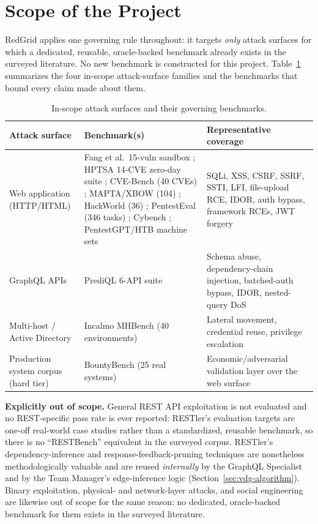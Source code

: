 \section{Scope of the Project}
\label{sec:intro_scope}

RedGrid applies one governing rule throughout: it targets \emph{only} attack surfaces for which a dedicated, reusable, oracle-backed benchmark already exists in the surveyed literature. No new benchmark is constructed for this project. Table~\ref{tab:in-scope-surfaces} summarizes the four in-scope attack-surface families and the benchmarks that bound every claim made about them.

\begin{table}[htbp]
\centering
\small
\caption{In-scope attack surfaces and their governing benchmarks.}
\label{tab:in-scope-surfaces}
\begin{tabular}{@{}p{3.1cm}p{5.6cm}p{5.6cm}@{}}
\toprule
\textbf{Attack surface} & \textbf{Benchmark(s)} & \textbf{Representative coverage} \\
\midrule
Web application (HTTP/HTML) & Fang et al.\ 15-vuln sandbox \citep{fang2024oneday}; HPTSA 14-CVE zero-day suite \citep{zhu2024hptsa}; CVE-Bench (40 CVEs) \citep{zhu2025cvebench}; MAPTA/XBOW (104) \citep{david2025mapta}; HackWorld (36) \citep{ren2025hackworld}; PentestEval (346 tasks) \citep{yang2025pentesteval}; Cybench \citep{zhang2025cybench}; PentestGPT/HTB machine sets \citep{deng2024pentestgpt} & SQLi, XSS, CSRF, SSRF, SSTI, LFI, file-upload RCE, IDOR, auth bypass, framework RCEs, JWT forgery \\
GraphQL APIs & PrediQL 6-API suite \citep{liu2025prediql} & Schema abuse, dependency-chain injection, batched-auth bypass, IDOR, nested-query DoS \\
Multi-host / Active Directory & Incalmo MHBench (40 environments) \citep{singer2025incalmo} & Lateral movement, credential reuse, privilege escalation \\
Production system corpus (hard tier) & BountyBench (25 real systems) \citep{zhang2025bountybench} & Economic/adversarial validation layer over the web surface \\
\bottomrule
\end{tabular}
\end{table}

\textbf{Explicitly out of scope.} General REST API exploitation is not evaluated and no REST-specific pass rate is ever reported: RESTler's \citep{atlidakis2019restler} evaluation targets are one-off real-world case studies rather than a standardized, reusable benchmark, so there is no ``RESTBench'' equivalent in the surveyed corpus. RESTler's dependency-inference and response-feedback-pruning techniques are nonetheless methodologically valuable and are reused \emph{internally} by the GraphQL Specialist and by the Team Manager's edge-inference logic (Section~\ref{sec:vdg-algorithm}). Binary exploitation, physical- and network-layer attacks, and social engineering are likewise out of scope for the same reason: no dedicated, oracle-backed benchmark for them exists in the surveyed literature.

